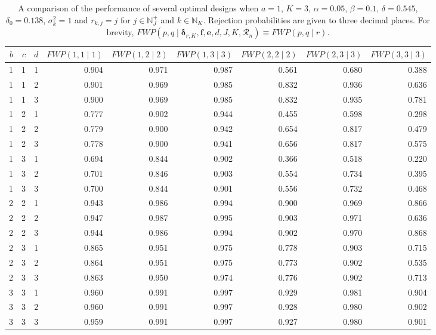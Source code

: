 \documentclass{article}
\numberwithin{equation}{section}
\theoremstyle{plain}
\begin{document}
\def\arraystretch{1.2}
\begin{sidewaystable}[htbp]
	\begin{center}
		\caption{A comparison of the performance of several optimal designs when $a=1$, $K=3$, $\alpha=0.05$, $\beta=0.1$, $\delta=0.545$, $\delta_0=0.138$, $\sigma_k^2=1$ and $r_{k,j}=j$ for $j\in\mathbb{N}_J^+$ and $k\in\mathbb{N}_K$. Rejection probabilities are given to three decimal places. For brevity, $FWP(p,q\mid \boldsymbol{\delta}_{r,K},\boldsymbol{f},\boldsymbol{e},d,J,K,\mathscr{R}_n)\equiv FWP(p,q\mid r)$.}
		\label{taba5}
		\begin{tabular}{rrrrrrrrr}
			\hline
			$b$ & $c$ & $d$ & $FWP(1,1\mid 1)$ & $FWP(1,2\mid 2)$ & $FWP(1,3\mid 3)$ & $FWP(2,2\mid 2)$ & $FWP(2,3\mid 3)$ & $FWP(3,3\mid 3)$ \\
			\hline
			1 & 1 & 1 & 0.904 & 0.971 & 0.987 & 0.561 & 0.680 & 0.388 \\
			1 & 1 & 2 & 0.901 & 0.969 & 0.985 & 0.832 & 0.936 & 0.636 \\
			1 & 1 & 3 & 0.900 & 0.969 & 0.985 & 0.832 & 0.935 & 0.781 \\
			1 & 2 & 1 & 0.777 & 0.902 & 0.944 & 0.455 & 0.598 & 0.298 \\
			1 & 2 & 2 & 0.779 & 0.900 & 0.942 & 0.654 & 0.817 & 0.479 \\
			1 & 2 & 3 & 0.778 & 0.900 & 0.941 & 0.656 & 0.817 & 0.575 \\
			1 & 3 & 1 & 0.694 & 0.844 & 0.902 & 0.366 & 0.518 & 0.220 \\
			1 & 3 & 2 & 0.701 & 0.846 & 0.903 & 0.554 & 0.734 & 0.395 \\
			1 & 3 & 3 & 0.700 & 0.844 & 0.901 & 0.556 & 0.732 & 0.468 \\
			2 & 2 & 1 & 0.943 & 0.986 & 0.994 & 0.900 & 0.969 & 0.866 \\
			2 & 2 & 2 & 0.947 & 0.987 & 0.995 & 0.903 & 0.971 & 0.636 \\
			2 & 2 & 3 & 0.944 & 0.986 & 0.994 & 0.902 & 0.970 & 0.868 \\
			2 & 3 & 1 & 0.865 & 0.951 & 0.975 & 0.778 & 0.903 & 0.715 \\
			2 & 3 & 2 & 0.864 & 0.951 & 0.975 & 0.773 & 0.902 & 0.535 \\
			2 & 3 & 3 & 0.863 & 0.950 & 0.974 & 0.776 & 0.902 & 0.713 \\
			3 & 3 & 1 & 0.960 & 0.991 & 0.997 & 0.929 & 0.981 & 0.904 \\
			3 & 3 & 2 & 0.960 & 0.991 & 0.997 & 0.928 & 0.980 & 0.902 \\
			3 & 3 & 3 & 0.959 & 0.991 & 0.997 & 0.927 & 0.980 & 0.901 \\
			\hline
		\end{tabular}
	\end{center}
\end{sidewaystable}
\end{document}
